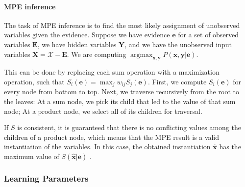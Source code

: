 \documentclass[10pt, titlepage]{article}
\theoremstyle{definition}
\newcommand\mb{\mathbf}
\DeclareMathOperator*{\argmax}{argmax}
\begin{document}
\paragraph{MPE inference}\label{if:map}
The task of MPE inference is to find the most likely assignment of unobserved variables given the evidence. Suppose we have evidence $\mb{e}$ for a set of observed variables $\mb{E}$, we have hidden variables $\mb{Y}$, and we have the unobserved input variables $\mb{X}=\mathcal{X}-\mb{E}$. We are computing $\argmax_{\mb{x},\mb{y}}P(\mb{x},\mb{y}|\mb{e})$.


This can be done by replacing each sum operation with a maximization operation, such that $S_i(\mb{e})=\max_{j}w_{ij}S_j(\mb{e})$. First, we compute $S_i(\mb{e})$ for every node from bottom to top. Next, we traverse recursively from the root to the leaves: At a sum node, we pick its child that led to the value of that sum node; At a product node, we select all of its children for traversal. 

If $S$ is consistent, it is guaranteed that there is no conflicting values among the children of a product node, which means that the MPE result is a valid instantiation of the variables. In this case, the obtained instantiation $\hat{\mb{x}}$ has the maximum value of $S(\hat{\mb{x}}|\mb{e})$ \cite{poon2011sum}.

\subsubsection{Learning Parameters}
\end{document}
